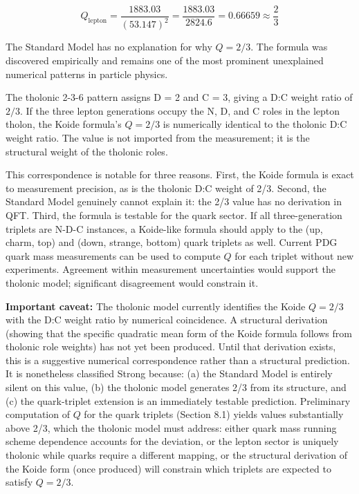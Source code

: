\documentclass[
  11pt,
  letterpaper,
]{article}
\begin{document}
\[Q_\text{lepton} = \frac{1883.03}{(53.147)^2} = \frac{1883.03}{2824.6} = 0.66659 \approx \frac{2}{3}\]

The Standard Model has no explanation for why \(Q = 2/3\). The formula
was discovered empirically and remains one of the most prominent
unexplained numerical patterns in particle physics.

The tholonic 2-3-6 pattern assigns D = 2 and C = 3, giving a D:C weight
ratio of \(2/3\). If the three lepton generations occupy the N, D, and C
roles in the lepton tholon, the Koide formula's \(Q = 2/3\) is
numerically identical to the tholonic D:C weight ratio. The value is not
imported from the measurement; it is the structural weight of the
tholonic roles.

This correspondence is notable for three reasons. First, the Koide
formula is exact to measurement precision, as is the tholonic D:C weight
of 2/3. Second, the Standard Model genuinely cannot explain it: the 2/3
value has no derivation in QFT. Third, the formula is testable for the
quark sector. If all three-generation triplets are N-D-C instances, a
Koide-like formula should apply to the (up, charm, top) and (down,
strange, bottom) quark triplets as well. Current PDG quark mass
measurements can be used to compute \(Q\) for each triplet without new
experiments. Agreement within measurement uncertainties would support
the tholonic model; significant disagreement would constrain it.

\textbf{Important caveat:} The tholonic model currently identifies the
Koide \(Q = 2/3\) with the D:C weight ratio by numerical coincidence. A
structural derivation (showing that the specific quadratic mean form of
the Koide formula follows from tholonic role weights) has not yet been
produced. Until that derivation exists, this is a suggestive numerical
correspondence rather than a structural prediction. It is nonetheless
classified Strong because: (a) the Standard Model is entirely silent on
this value, (b) the tholonic model generates 2/3 from its structure, and
(c) the quark-triplet extension is an immediately testable prediction.
Preliminary computation of \(Q\) for the quark triplets (Section 8.1)
yields values substantially above 2/3, which the tholonic model must
address: either quark mass running scheme dependence accounts for the
deviation, or the lepton sector is uniquely tholonic while quarks
require a different mapping, or the structural derivation of the Koide
form (once produced) will constrain which triplets are expected to
satisfy \(Q = 2/3\).
\end{document}
